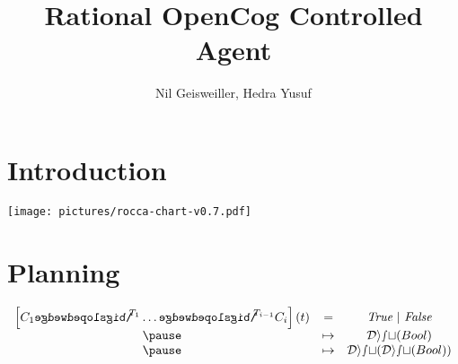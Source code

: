 \documentclass[aspectratio=169]{beamer}
\title{Rational OpenCog Controlled Agent}
\author{Nil Geisweiller, Hedra Yusuf}
\institute[SingularityNET OpenCog Foundations]
{
  \begin{center}
    AGI-23\\
    \texttt{[image: pictures/snet\_oc.png]}
  \end{center}
}
\date[AGI-23]
\newcommand{\lbseqand}[1]{\reflectbox{$\bigslopedwedge$}^{#1}}
\begin{document}
\section{Introduction}

\begin{frame}
  \maketitle
\end{frame}

\begin{frame}

  \begin{center}
    \texttt{[image: pictures/rocca-chart-v0.7.pdf]}
  \end{center}

\end{frame}

\section{Planning}

\begin{frame}


  \begin{center}
  \end{center}


  \pause
  \pause

  {\large
    $$
    \begin{array}{ccc}
      \left[ C_1 \lbseqand{\!\! T_1} \dots \lbseqand{\!\! T_{i-1}} C_i
      \right](t) & = & \textit{True}\ |\ \textit{False}\\
      \pause & \mapsto & \mathcal{Dist}(Bool) \\
      \pause & \mapsto & \mathcal{Dist}(\mathcal{Dist}(Bool)) \\
    \end{array}
    $$
  }


\end{frame}
\end{document}
